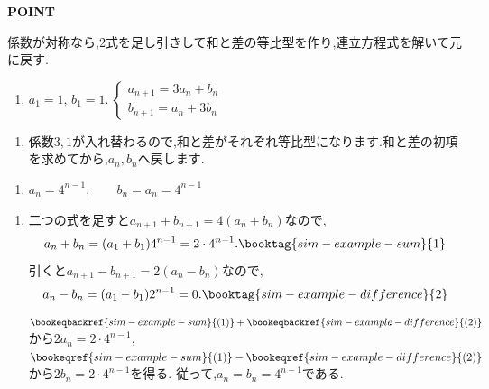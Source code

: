 \begin{bookpoint}
  \textbf{POINT}\par
  係数が対称なら,2式を足し引きして和と差の等比型を作り,連立方程式を解いて元に戻す.
\end{bookpoint}

\noindent {}\par\nobreak
\begin{enumerate}[label=(\arabic*),parsep=3pt,format=\bookitemlink{example-system-1}{problem}{hint}]
  \item $a_1=1,\,b_1=1.\ \begin{cases}a_{n+1}=3a_n+b_n\\ b_{n+1}=a_n+3b_n\end{cases}$
\end{enumerate}

\noindent {}\par\nobreak
\begin{enumerate}[label=(\arabic*),parsep=3pt,format=\bookitemlink{example-system-1}{hint}{answer}]
  \item 係数$3,1$が入れ替わるので,和と差がそれぞれ等比型になります.和と差の初項を求めてから,$a_n,b_n$へ戻します.
\end{enumerate}

\noindent {}\par\nobreak
\begin{enumerate}[label=(\arabic*),parsep=3pt,format=\bookitemlink{example-system-1}{answer}{solution}]
  \item $a_n=4^{n-1},\qquad b_n=a_n=4^{n-1}$
\end{enumerate}

\noindent {}\par\nobreak
\begin{enumerate}[label=(\arabic*),parsep=3pt,format=\bookitemlink{example-system-1}{solution}{problem}]
  \item 二つの式を足すと$a_{n+1}+b_{n+1}=4(a_n+b_n)$なので,
    \[
      a_n+b_n=(a_1+b_1)4^{n-1}=2\cdot4^{n-1}.
      \booktag{sim-example-sum}{1}
    \]
    引くと$a_{n+1}-b_{n+1}=2(a_n-b_n)$なので,
    \[
      a_n-b_n=(a_1-b_1)2^{n-1}=0.
      \booktag{sim-example-difference}{2}
    \]
    $\bookeqbackref{sim-example-sum}{(1)}+\bookeqbackref{sim-example-difference}{(2)}$から$2a_n=2\cdot4^{n-1}$,
    $\bookeqref{sim-example-sum}{(1)}-\bookeqref{sim-example-difference}{(2)}$から$2b_n=2\cdot4^{n-1}$を得る.
    従って,$a_n=b_n=4^{n-1}$である.
\end{enumerate}


